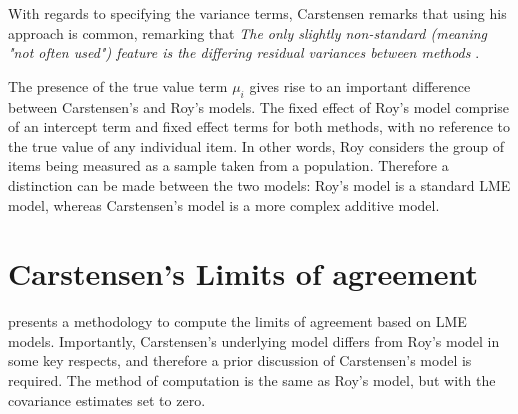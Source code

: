 \documentclass{report}
\begin{document}
	With regards to specifying the variance terms, Carstensen remarks that using his approach is common, remarking that \emph{
		The only slightly non-standard (meaning "not often used") feature is the differing residual variances between methods }\citep{bxc2010}.
	
	
	
	The presence of the true value term $\mu_i$ gives rise to an important difference between Carstensen's and Roy's models. The fixed effect of Roy's model comprise of an intercept term and fixed effect terms for both methods, with no reference to the true value of any individual item. In other words, Roy considers the group of items being measured as a sample taken from a population. Therefore a distinction can be made between the two models: Roy's model is a standard LME model, whereas Carstensen's model is a more complex additive model.
	
	
	
	
	\section{Carstensen's Limits of agreement}
	\citet{BXC2008} presents a methodology to compute the limits of
	agreement based on LME models. Importantly, Carstensen's underlying model differs from Roy's model in some key respects, and therefore a prior discussion of Carstensen's model is required. The method of computation is the
	same as Roy's model, but with the covariance estimates set to zero.
	
\end{document}
